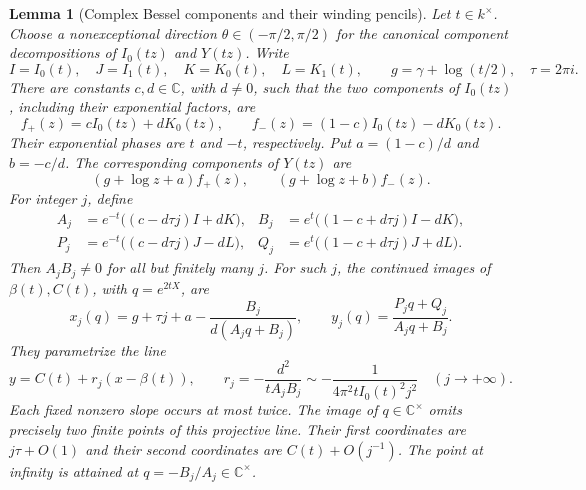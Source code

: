 \documentclass[11pt]{article}
\newtheorem{lemma}[theorem]{Lemma}
\theoremstyle{definition}
\theoremstyle{remark}
\begin{document}
\begin{lemma}[Complex Bessel components and their winding pencils]
\label{cxi:components}
Let $t\in k^\times$.  Choose a nonexceptional direction
$\theta\in(-\pi/2,\pi/2)$ for the canonical component decompositions
of $I_0(tz)$ and $Y(tz)$.  Write
\[
 I=I_0(t),\quad J=I_1(t),\quad K=K_0(t),\quad L=K_1(t),\qquad
 g=\gamma+\log(t/2),\quad \tau=2\pi i.
\]
There are constants $c,d\in\mathbb C$, with $d\ne0$, such that the
two components of $I_0(tz)$, including their exponential factors, are
\begin{equation}\label{cxi:split}
 f_+(z)=cI_0(tz)+dK_0(tz),\qquad
 f_-(z)=(1-c)I_0(tz)-dK_0(tz).
\end{equation}
Their exponential phases are $t$ and $-t$, respectively.  Put
$a=(1-c)/d$ and $b=-c/d$.  The corresponding components of $Y(tz)$ are
\begin{equation}\label{cxi:Ysplit}
 (g+\log z+a)f_+(z),\qquad (g+\log z+b)f_-(z).
\end{equation}
For integer $j$, define
\begin{align*}
 A_j&=e^{-t}\bigl((c-d\tau j)I+dK\bigr),&
 B_j&=e^t\bigl((1-c+d\tau j)I-dK\bigr),\\
 P_j&=e^{-t}\bigl((c-d\tau j)J-dL\bigr),&
 Q_j&=e^t\bigl((1-c+d\tau j)J+dL\bigr).
\end{align*}
Then $A_jB_j\ne0$ for all but finitely many $j$.  For such $j$, the
continued images of $\beta(t),C(t)$, with $q=e^{2tX}$, are
\begin{equation}\label{cxi:images}
 x_j(q)=g+\tau j+a-\frac{B_j}{d(A_jq+B_j)},\qquad
 y_j(q)=\frac{P_jq+Q_j}{A_jq+B_j}.
\end{equation}
They parametrize the line
\begin{equation}\label{cxi:line}
 y=C(t)+r_j(x-\beta(t)),\qquad
 r_j=-\frac{d^2}{tA_jB_j}
     \sim-\frac{1}{4\pi^2tI_0(t)^2j^2}
       \quad(j\longrightarrow+\infty).
\end{equation}
Each fixed nonzero slope occurs at most twice.  The image of
$q\in\mathbb C^\times$ omits precisely two finite points of this
projective line.  Their first coordinates are $j\tau+O(1)$ and their
second coordinates are $C(t)+O(j^{-1})$.  The point at infinity is
attained at $q=-B_j/A_j\in\mathbb C^\times$.
\end{lemma}
\end{document}
